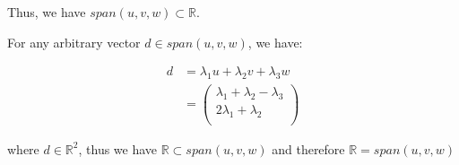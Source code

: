 \documentclass[11pt]{article}
\begin{document}
Thus, we have $span(u, v, w) \subset \mathbb{R}$.

For any arbitrary vector $d \in span(u, v, w)$, we have:

\begin{align*}
    d &= \lambda_1 u + \lambda_2 v + \lambda_3 w \\
    &= \begin{pmatrix}
        \lambda_1 + \lambda_2 - \lambda_3 \\
        2\lambda_1 + \lambda_2\\
    \end{pmatrix}
\end{align*}

where $d \in \mathbb{R}^2$, thus we have $\mathbb{R} \subset span(u, v, w)$ and therefore $\mathbb{R} = span(u, v, w)$
\end{document}
